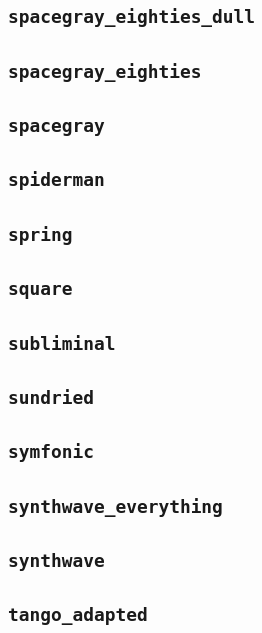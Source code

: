 \subsection{\texttt{spacegray\_eighties\_dull}}
\newpage
\subsection{\texttt{spacegray\_eighties}}
\newpage
\subsection{\texttt{spacegray}}
\newpage
\subsection{\texttt{spiderman}}
\newpage
\subsection{\texttt{spring}}
\newpage
\subsection{\texttt{square}}
\newpage
\subsection{\texttt{subliminal}}
\newpage
\subsection{\texttt{sundried}}
\newpage
\subsection{\texttt{symfonic}}
\newpage
\subsection{\texttt{synthwave\_everything}}
\newpage
\subsection{\texttt{synthwave}}
\newpage
\subsection{\texttt{tango\_adapted}}
\newpage
